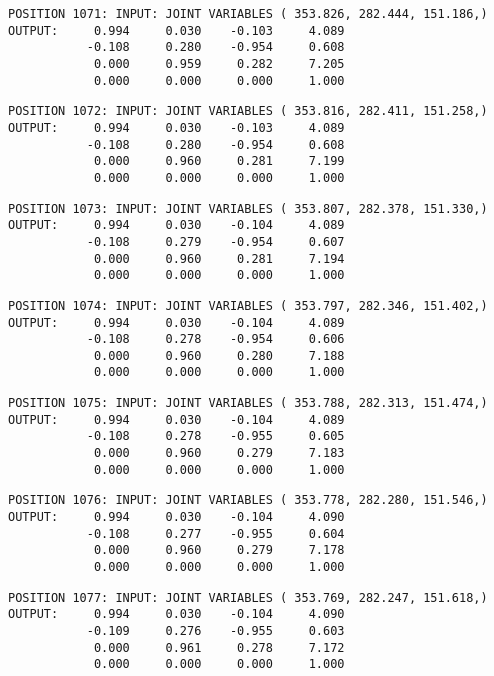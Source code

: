 \begin{verbatim}
POSITION 1071: INPUT: JOINT VARIABLES ( 353.826, 282.444, 151.186,)
OUTPUT:     0.994     0.030    -0.103     4.089
           -0.108     0.280    -0.954     0.608
            0.000     0.959     0.282     7.205
            0.000     0.000     0.000     1.000
\end{verbatim} \pagebreak[1]\begin{verbatim}
POSITION 1072: INPUT: JOINT VARIABLES ( 353.816, 282.411, 151.258,)
OUTPUT:     0.994     0.030    -0.103     4.089
           -0.108     0.280    -0.954     0.608
            0.000     0.960     0.281     7.199
            0.000     0.000     0.000     1.000
\end{verbatim} \pagebreak[1]\begin{verbatim}
POSITION 1073: INPUT: JOINT VARIABLES ( 353.807, 282.378, 151.330,)
OUTPUT:     0.994     0.030    -0.104     4.089
           -0.108     0.279    -0.954     0.607
            0.000     0.960     0.281     7.194
            0.000     0.000     0.000     1.000
\end{verbatim} \pagebreak[1]\begin{verbatim}
POSITION 1074: INPUT: JOINT VARIABLES ( 353.797, 282.346, 151.402,)
OUTPUT:     0.994     0.030    -0.104     4.089
           -0.108     0.278    -0.954     0.606
            0.000     0.960     0.280     7.188
            0.000     0.000     0.000     1.000
\end{verbatim} \pagebreak[1]\begin{verbatim}
POSITION 1075: INPUT: JOINT VARIABLES ( 353.788, 282.313, 151.474,)
OUTPUT:     0.994     0.030    -0.104     4.089
           -0.108     0.278    -0.955     0.605
            0.000     0.960     0.279     7.183
            0.000     0.000     0.000     1.000
\end{verbatim} \pagebreak[1]\begin{verbatim}
POSITION 1076: INPUT: JOINT VARIABLES ( 353.778, 282.280, 151.546,)
OUTPUT:     0.994     0.030    -0.104     4.090
           -0.108     0.277    -0.955     0.604
            0.000     0.960     0.279     7.178
            0.000     0.000     0.000     1.000
\end{verbatim} \pagebreak[1]\begin{verbatim}
POSITION 1077: INPUT: JOINT VARIABLES ( 353.769, 282.247, 151.618,)
OUTPUT:     0.994     0.030    -0.104     4.090
           -0.109     0.276    -0.955     0.603
            0.000     0.961     0.278     7.172
            0.000     0.000     0.000     1.000
\end{verbatim} \pagebreak[1]\begin{verbatim}

\end{verbatim}
